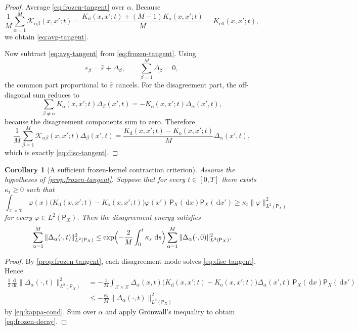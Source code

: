 \documentclass[11pt]{article}
\newtheorem{corollary}[theorem]{Corollary}
\theoremstyle{definition}
\newcommand{\dd}{\,\mathrm{d}}
\begin{document}
\begin{proof}
Average \eqref{eq:frozen-tangent} over $\alpha$.
Because
\[
  \frac1M \sum_{\alpha=1}^M \mathcal K_{\alpha\beta}(x,x';t)
  =
  \frac{K_{\mathrm d}(x,x';t)+(M-1)K_{\mathrm o}(x,x';t)}{M}
  =
  K_{\mathrm{eff}}(x,x';t),
\]
we obtain \eqref{eq:avg-tangent}.

Now subtract \eqref{eq:avg-tangent} from \eqref{eq:frozen-tangent}.
Using
\[
  \varepsilon_\beta=\bar \varepsilon+\Delta_\beta,
  \qquad
  \sum_{\beta=1}^M \Delta_\beta=0,
\]
the common part proportional to $\bar \varepsilon$ cancels.
For the disagreement part, the off-diagonal sum reduces to
\[
  \sum_{\beta\neq\alpha} K_{\mathrm o}(x,x';t)\Delta_\beta(x',t)
  =
  -K_{\mathrm o}(x,x';t)\Delta_\alpha(x',t),
\]
because the disagreement components sum to zero.
Therefore
\[
  \frac1M \sum_{\beta=1}^M
  \mathcal K_{\alpha\beta}(x,x';t)\Delta_\beta(x',t)
  =
  \frac{K_{\mathrm d}(x,x';t)-K_{\mathrm o}(x,x';t)}{M}
  \Delta_\alpha(x',t),
\]
which is exactly \eqref{eq:disc-tangent}.
\end{proof}

\begin{corollary}[A sufficient frozen-kernel contraction criterion]
\label{cor:frozen-contraction}
Assume the hypotheses of \cref{prop:frozen-tangent}.
Suppose that for every $t\in[0,T]$ there exists $\kappa_t\ge 0$ such that
\begin{equation}
  \int_{\mathcal X\times \mathcal X}
  \varphi(x)
  \bigl(
    K_{\mathrm d}(x,x';t)-K_{\mathrm o}(x,x';t)
  \bigr)
  \varphi(x')
  \,\mathsf P_X(\dd x)\mathsf P_X(\dd x')
  \ge
  \kappa_t \|\varphi\|_{L^2(\mathsf P_X)}^2
  \label{eq:kappa-cond}
\end{equation}
for every $\varphi \in L^2(\mathsf P_X)$.
Then the disagreement energy satisfies
\begin{equation}
  \sum_{\alpha=1}^M
  \|\Delta_\alpha(\cdot,t)\|_{L^2(\mathsf P_X)}^2
  \le
  \exp\Bigl(
    -\frac{2}{M}\int_0^t \kappa_s\,\dd s
  \Bigr)
  \sum_{\alpha=1}^M
  \|\Delta_\alpha(\cdot,0)\|_{L^2(\mathsf P_X)}^2.
  \label{eq:frozen-decay}
\end{equation}
\end{corollary}

\begin{proof}
By \cref{prop:frozen-tangent}, each disagreement mode solves \eqref{eq:disc-tangent}.
Hence
\begin{align*}
  \frac12 \frac{\dd}{\dd t}
  \|\Delta_\alpha(\cdot,t)\|_{L^2(\mathsf P_X)}^2
  &=
  -\frac1M
  \int_{\mathcal X\times \mathcal X}
  \Delta_\alpha(x,t)
  \bigl(
    K_{\mathrm d}(x,x';t)-K_{\mathrm o}(x,x';t)
  \bigr)
  \Delta_\alpha(x',t)
  \,\mathsf P_X(\dd x)\mathsf P_X(\dd x')
  \\
  &\le
  -\frac{\kappa_t}{M}
  \|\Delta_\alpha(\cdot,t)\|_{L^2(\mathsf P_X)}^2
\end{align*}
by \eqref{eq:kappa-cond}.
Sum over $\alpha$ and apply Gr\"onwall's inequality to obtain \eqref{eq:frozen-decay}.
\end{proof}
\end{document}
